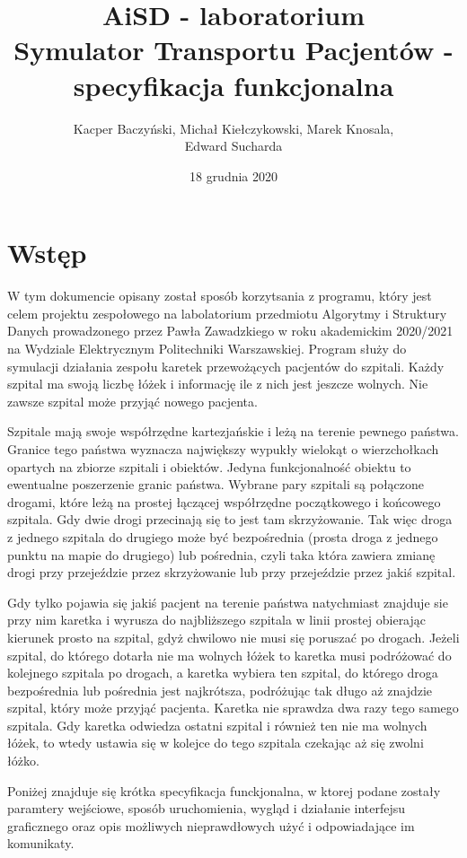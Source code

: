 \documentclass[10pt,a4paper]{article}
\title{\huge AiSD - laboratorium \\ \Large Symulator Transportu Pacjentów - specyfikacja funkcjonalna}
\author{Kacper Baczyński, Michał Kiełczykowski, Marek Knosala, \\ Edward Sucharda}
\begin{document}
\date{18 grudnia 2020}

\maketitle


\section{Wstęp}

W tym dokumencie opisany został sposób korzytsania z programu, który jest celem projektu zespołowego na labolatorium przedmiotu Algorytmy i Struktury Danych prowadzonego przez Pawła Zawadzkiego w roku akademickim 2020/2021 na Wydziale Elektrycznym Politechniki Warszawskiej. Program służy do symulacji działania zespołu karetek przewożących pacjentów do szpitali. Każdy szpital ma swoją liczbę łóżek i informację ile z nich jest jeszcze wolnych. Nie zawsze szpital może przyjąć nowego pacjenta.

Szpitale mają swoje współrzędne kartezjańskie i leżą na terenie pewnego państwa. Granice tego państwa wyznacza największy wypukły wielokąt o wierzchołkach opartych na zbiorze szpitali i obiektów. Jedyna funkcjonalność obiektu to ewentualne poszerzenie granic państwa. Wybrane pary szpitali są połączone drogami, które leżą na prostej łączącej współrzędne początkowego i końcowego szpitala. Gdy dwie drogi przecinają się to jest tam skrzyżowanie. Tak więc droga z jednego szpitala do drugiego może być bezpośrednia (prosta droga z jednego punktu na mapie do drugiego) lub pośrednia, czyli taka która zawiera zmianę drogi przy przejeździe przez skrzyżowanie lub przy przejeździe przez jakiś szpital.

Gdy tylko pojawia się jakiś pacjent na terenie państwa natychmiast znajduje sie przy nim karetka i wyrusza do najbliższego szpitala w linii prostej obierając kierunek prosto na szpital, gdyż chwilowo nie musi się poruszać po drogach. Jeżeli szpital, do którego dotarła nie ma wolnych łóżek to karetka musi podróżować do kolejnego szpitala po drogach, a karetka wybiera ten szpital, do którego droga bezpośrednia lub pośrednia jest najkrótsza, podróżując tak długo aż znajdzie szpital, który może przyjąć pacjenta. Karetka nie sprawdza dwa razy tego samego szpitala. Gdy karetka odwiedza ostatni szpital i również ten nie ma wolnych łóżek, to wtedy ustawia się w kolejce do tego szpitala czekając aż się zwolni łóżko.

Poniżej znajduje się krótka specyfikacja funckjonalna, w ktorej podane zostały paramtery wejściowe, sposób uruchomienia, wygląd i działanie interfejsu graficznego oraz opis możliwych nieprawdłowych użyć i odpowiadające im komunikaty.
\end{document}
